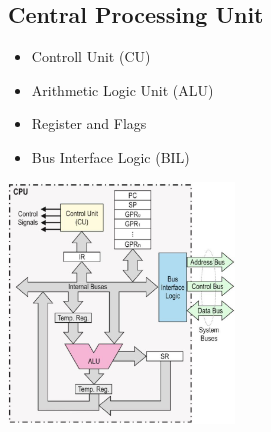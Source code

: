 	\subsection{Central Processing Unit }
\begin{minipage}{12cm}
	\begin{itemize}
		\item Controll Unit (\acs{CU})
		\item Arithmetic Logic Unit (\acs{ALU})
		\item Register and Flags
		\item Bus Interface Logic (\acs{BIL})
	\end{itemize}
\end{minipage}
\begin{minipage}{6cm}
	\includegraphics[width=6cm]{images/CPUComponents}	
\end{minipage}
